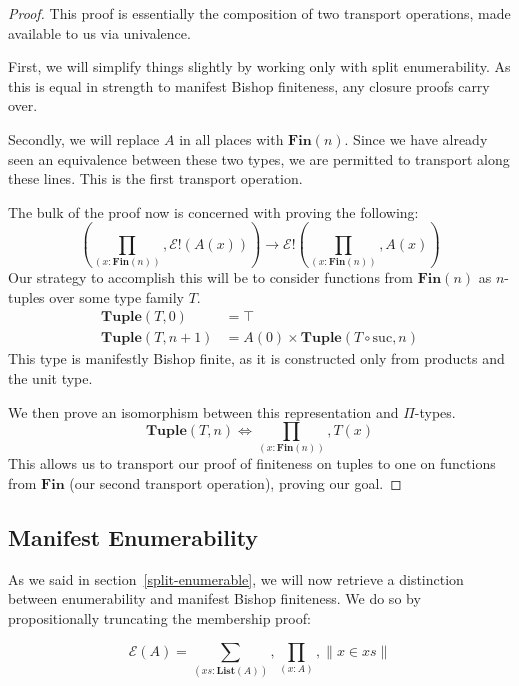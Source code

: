 \begin{proof}
  This proof is essentially the composition of two transport operations, made
  available to us via univalence.
  
  First, we will simplify things slightly by working only with split
  enumerability.
  As this is equal in strength to manifest Bishop finiteness, any closure proofs
  carry over.

  Secondly, we will replace \(A\) in all places with \(\mathbf{Fin}(n)\).
  Since we have already seen an equivalence between these two types, we are
  permitted to transport along these lines.
  This is the first transport operation.

  The bulk of the proof now is concerned with proving the following:
  \begin{equation}
    \left( \prod_{(x : \mathbf{Fin}(n))} , \mathcal{E}!(A(x)) \right) \rightarrow \mathcal{E}!\left( \prod_{(x : \mathbf{Fin}(n))} , A(x) \right)
  \end{equation}
  Our strategy to accomplish this will be to consider functions from
  \(\mathbf{Fin}(n)\) as \(n\)-tuples over some type family \(T\).
  \begin{equation}
    \begin{aligned}
      \mathbf{Tuple}(T, 0)   &= \top \\
      \mathbf{Tuple}(T, n+1) &= A(0) \times \mathbf{Tuple}(T \circ \text{suc}, n)
    \end{aligned}
  \end{equation}
  This type is manifestly Bishop finite, as it is constructed only from products
  and the unit type.
  
  We then prove an isomorphism between this representation and \(\Pi\)-types.
  \begin{equation}
    \mathbf{Tuple}(T, n) \iff \prod_{(x : \mathbf{Fin}(n))} , T(x)
  \end{equation}
  This allows us to transport our proof of finiteness on tuples to one on
  functions from \(\mathbf{Fin}\) (our second transport operation), proving our
  goal.
  
\end{proof}
\subsection{Manifest Enumerability} \label{manifest-enumerability}
As we said in section~\ref{split-enumerable}, we will now retrieve a distinction
between enumerability and manifest Bishop finiteness.
We do so by propositionally truncating the membership proof:
\begin{definition}
  \begin{equation}
    \mathcal{E}(A) = \sum_{(\mathit{xs} : \mathbf{List}(A))} , \prod_{(x : A)} , \lVert x \in \mathit{xs} \rVert
  \end{equation}
\end{definition}

